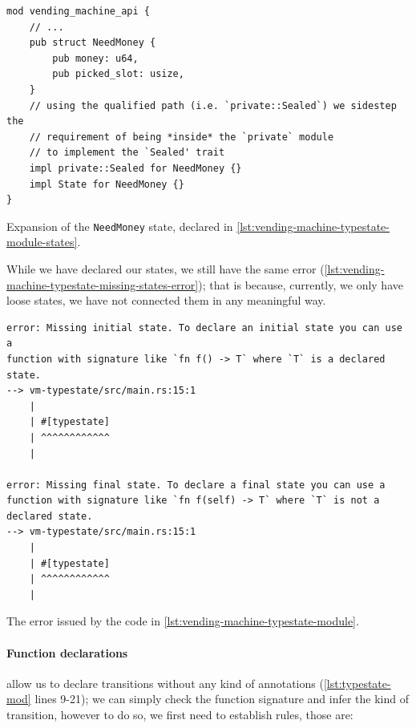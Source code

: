\begin{listing}
    \begin{verbatim}
mod vending_machine_api {
    // ...
    pub struct NeedMoney {
        pub money: u64,
        pub picked_slot: usize,
    }
    // using the qualified path (i.e. `private::Sealed`) we sidestep the
    // requirement of being *inside* the `private` module
    // to implement the `Sealed' trait
    impl private::Sealed for NeedMoney {}
    impl State for NeedMoney {}
}
    \end{verbatim}
    \caption{Expansion of the \texttt{NeedMoney} state, declared in \autoref{lst:vending-machine-typestate-module-states}.}
    \label{lst:vending-machine-typestate-module-states-expansion}
\end{listing}

While we have declared our states, we still have the same error (\autoref{lst:vending-machine-typestate-missing-states-error});
that is because, currently, we only have loose states, we have not connected them in any meaningful way.

\begin{listing}
    \begin{verbatim}
error: Missing initial state. To declare an initial state you can use a
function with signature like `fn f() -> T` where `T` is a declared state.
--> vm-typestate/src/main.rs:15:1
    |
    | #[typestate]
    | ^^^^^^^^^^^^
    |

error: Missing final state. To declare a final state you can use a
function with signature like `fn f(self) -> T` where `T` is not a declared state.
--> vm-typestate/src/main.rs:15:1
    |
    | #[typestate]
    | ^^^^^^^^^^^^
    |
    \end{verbatim}
    \caption{The error issued by the code in \autoref{lst:vending-machine-typestate-module}.}
    \label{lst:vending-machine-typestate-missing-states-error}
\end{listing}


\paragraph{Function declarations} allow us to declare transitions without any kind of annotations (\autoref{lst:typestate-mod} lines 9-21);
we can simply check the function signature and infer the kind of transition,
however to do so, we first need to establish rules, those are:

